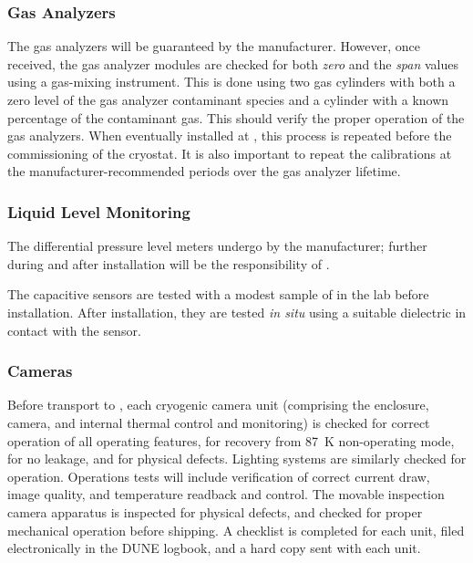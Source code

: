 \subsubsection{Gas Analyzers}
\label{sec:fdgen-slow-cryo-qc-ga}

The gas analyzers will be guaranteed by the manufacturer. However, once received, the gas analyzer modules are checked for both \textit{zero} and the \textit{span} values using a gas-mixing instrument. This is done using two gas cylinders with both a zero level of the gas analyzer contaminant species and a cylinder with a known percentage of the contaminant gas. This should verify the proper operation of the gas analyzers. When eventually installed at \surf, this process is repeated before the commissioning of the cryostat. It is also important to repeat the calibrations at the manufacturer-recommended periods over the gas analyzer lifetime.


\subsubsection{Liquid Level Monitoring}
\label{sec:fdgen-slow-cryo-qc-llm}

The differential pressure level meters undergo  by the manufacturer; further  during and after installation will be the responsibility of .

The capacitive sensors are tested with a modest sample of \lar in the lab before installation. After installation, they are tested {\em in situ} using a suitable dielectric in contact with the sensor.

\subsubsection{Cameras}
\label{sec:fdgen-slow-cryo-qc-c}

Before transport to \surf, each cryogenic camera unit (comprising the enclosure, camera, and internal thermal control and monitoring) is checked for correct operation of all operating features, for recovery from \SI{87}{K} non-operating mode, for no leakage, and for physical defects. Lighting systems are similarly checked for operation. Operations tests will include verification of correct current draw, image quality, and temperature readback and control. The movable inspection camera apparatus is inspected for physical defects, and checked for proper mechanical operation before shipping. A checklist is completed for each unit, filed electronically in the DUNE logbook, and a hard copy sent with each unit. 


